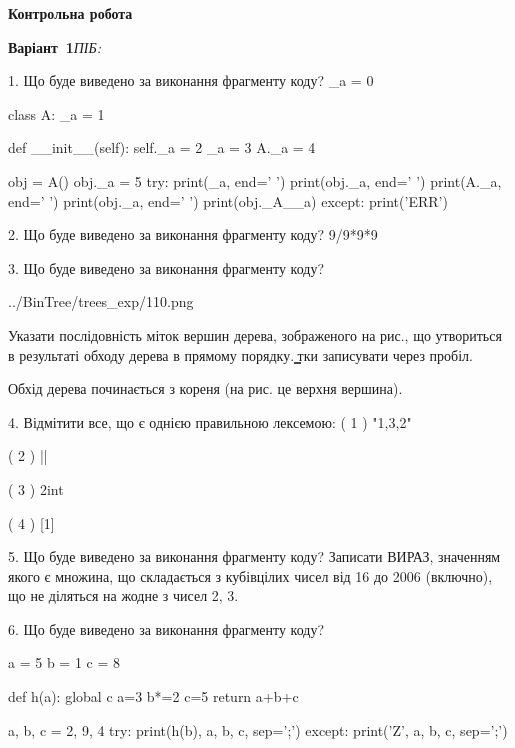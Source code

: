 \documentclass[11pt]{article}
\begin{document}
{\large\textbf{Контрольна робота}}

\textbf{Варіант \No\,1}\hfill \textit{ПІБ:}\,\underline{\hspace{60mm}}
\vspace{4mm}

1. Що буде виведено за виконання фрагменту коду?
_a = 0

class A:
    _a = 1
    
    def __init__(self):
        self._a = 2
        _a = 3
        A._a = 4

obj = A()
obj._a = 5
try:
    print(_a, end=' ')
    print(obj._a, end=' ')
    print(A._a, end=' ')
    print(obj._a, end=' ')
    print(obj._A__a)
except:
    print('ERR')


2. Що буде виведено за виконання фрагменту коду?
9/9*9*9

3. Що буде виведено за виконання фрагменту коду?

\begin{center}
	{../BinTree/trees_exp/110.png}
\end{center}
Указати послідовність міток вершин дерева, зображеного на рис., що утвориться в результаті обходу дерева в прямому порядку. ̳тки записувати через пробіл.\par Обхід дерева починається з кореня (на рис. це верхня вершина).

4. %
Відмітити все, що є однією правильною лексемою:
( 1 ) "1,3,2"

( 2 ) ||

( 3 ) 2int

( 4 ) [1]


5. Що буде виведено за виконання фрагменту коду?
Записати ВИРАЗ, значенням якого є множина, що складається з кубівцілих чисел від 16 до 2006 (включно), що не діляться на жодне з чисел 2, 3.


6. Що буде виведено за виконання фрагменту коду?

a = 5
b = 1
c = 8

def h(a):
global c    a=3
    b*=2
    c=5
    return a+b+c

a, b, c = 2, 9, 4
try:
    print(h(b), a, b, c, sep=';')
except:
    print('Z', a, b, c, sep=';')
\end{document}

